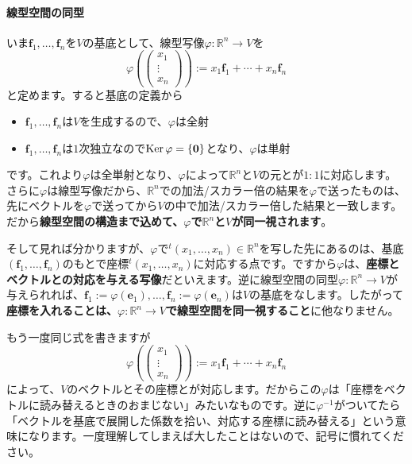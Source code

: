 \paragraph{線型空間の同型} いま$\bm{f}_1, \ldots, \bm{f}_n$を$V$の基底として、線型写像$\varphi\colon\mathbb{R}^n\rightarrow V$を
\[
\varphi\left(
\begin{pmatrix}
x_1 \\
\vdots \\
x_n
\end{pmatrix}
\right)
:= x_1 \bm{f}_1 + \cdots + x_n \bm{f}_n
\]
と定めます。すると基底の定義から
\begin{itemize}
\item $\bm{f}_1, \ldots, \bm{f}_n$は$V$を生成するので、$\varphi$は全射
\item $\bm{f}_1, \ldots, \bm{f}_n$は$1$次独立なので$\operatorname{Ker}\varphi = \{\boldsymbol{0}\}$となり、$\varphi$は単射
\end{itemize}
です。これより$\varphi$は全単射となり、$\varphi$によって$\mathbb{R}^n$と$V$の元とが$1:1$に対応します。さらに$\varphi$は線型写像だから、$\mathbb{R}^n$での加法/スカラー倍の結果を$\varphi$で送ったものは、先にベクトルを$\varphi$で送ってから$V$の中で加法/スカラー倍した結果と一致します。だから\textbf{線型空間の構造まで込めて、$\varphi$で$\mathbb{R}^n$と$V$が同一視されます}。

そして見れば分かりますが、$\varphi$で${}^t(x_1, \ldots, x_n) \in \mathbb{R}^n$を写した先にあるのは、基底$(\bm{f}_1, \ldots, \bm{f}_n)$のもとで座標${}^t(x_1, \ldots, x_n)$に対応する点です。ですから$\varphi$は、\textbf{座標とベクトルとの対応を与える写像}だといえます。逆に線型空間の同型$\varphi\colon \mathbb{R}^n\rightarrow V$が与えられれば、$\bm{f}_1 := \varphi(\bm{e}_1), \ldots, \bm{f}_n := \varphi(\bm{e}_n)$は$V$の基底をなします。したがって\textbf{座標を入れることは、$\varphi\colon \mathbb{R}^n \rightarrow V$で線型空間を同一視すること}に他なりません。

もう一度同じ式を書きますが
\[
\varphi\left(
\begin{pmatrix}
x_1 \\
\vdots \\
x_n
\end{pmatrix}
\right)
:= x_1 \bm{f}_1 + \cdots + x_n \bm{f}_n
\]
によって、$V$のベクトルとその座標とが対応します。だからこの$\varphi$は「座標をベクトルに読み替えるときのおまじない」みたいなものです。逆に$\varphi^{-1}$がついてたら「ベクトルを基底で展開した係数を拾い、対応する座標に読み替える」という意味になります。一度理解してしまえば大したことはないので、記号に慣れてください。

